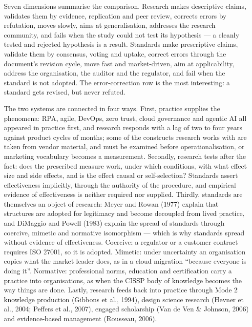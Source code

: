 \documentclass[11pt,a4paper,british,twoside=false,headings=small,chapterprefix=false,numbers=noenddot]{scrbook}
\begin{document}
Seven dimensions summarise the comparison. Research makes descriptive claims, validates them by evidence, replication and peer review, corrects errors by refutation, moves slowly, aims at generalisation, addresses the research community, and fails when the study could not test its hypothesis --- a cleanly tested and rejected hypothesis is a result. Standards make prescriptive claims, validate them by consensus, voting and uptake, correct errors through the document's revision cycle, move fast and market-driven, aim at applicability, address the organisation, the auditor and the regulator, and fail when the standard is not adopted. The error-correction row is the most interesting: a standard gets revised, but never refuted.

The two systems are connected in four ways. First, practice supplies the phenomena: RPA, agile, DevOps, zero trust, cloud governance and agentic AI all appeared in practice first, and research responds with a lag of two to four years against product cycles of months; some of the constructs research works with are taken from vendor material, and must be examined before operationalisation, or marketing vocabulary becomes a measurement. Secondly, research tests after the fact: does the prescribed measure work, under which conditions, with what effect size and side effects, and is the effect causal or self-selection? Standards assert effectiveness implicitly, through the authority of the procedure, and empirical evidence of effectiveness is neither required nor supplied. Thirdly, standards are themselves an object of research: Meyer and Rowan (1977) explain that structures are adopted for legitimacy and become decoupled from lived practice, and DiMaggio and Powell (1983) explain the spread of standards through coercive, mimetic and normative isomorphism --- which is why standards spread without evidence of effectiveness. Coercive: a regulator or a customer contract requires ISO 27001, so it is adopted. Mimetic: under uncertainty an organisation copies what the market leader does, as in a cloud migration ``because everyone is doing it''. Normative: professional norms, education and certification carry a practice into organisations, as when the CISSP body of knowledge becomes the way things are done. Lastly, research feeds back into practice through Mode 2 knowledge production (Gibbons et al., 1994), design science research (Hevner et al., 2004; Peffers et al., 2007), engaged scholarship (Van de Ven \& Johnson, 2006) and evidence-based management (Rousseau, 2006).
\end{document}

